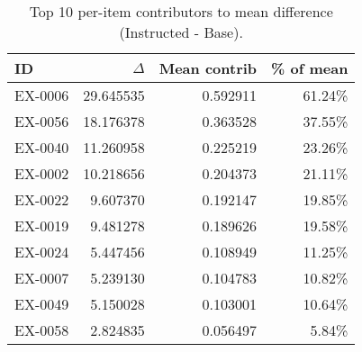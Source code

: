 \begin{table}[t]
\centering
\caption{Top 10 per-item contributors to mean difference (Instructed - Base).}
\label{tab:top10}
\begin{tabular}{lrrr}
\toprule
ID & $\Delta$ & Mean contrib & \% of mean \\
\midrule
EX-0006 & 29.645535 & 0.592911 & 61.24\% \\
EX-0056 & 18.176378 & 0.363528 & 37.55\% \\
EX-0040 & 11.260958 & 0.225219 & 23.26\% \\
EX-0002 & 10.218656 & 0.204373 & 21.11\% \\
EX-0022 & 9.607370 & 0.192147 & 19.85\% \\
EX-0019 & 9.481278 & 0.189626 & 19.58\% \\
EX-0024 & 5.447456 & 0.108949 & 11.25\% \\
EX-0007 & 5.239130 & 0.104783 & 10.82\% \\
EX-0049 & 5.150028 & 0.103001 & 10.64\% \\
EX-0058 & 2.824835 & 0.056497 & 5.84\% \\
\bottomrule
\end{tabular}
\end{table}